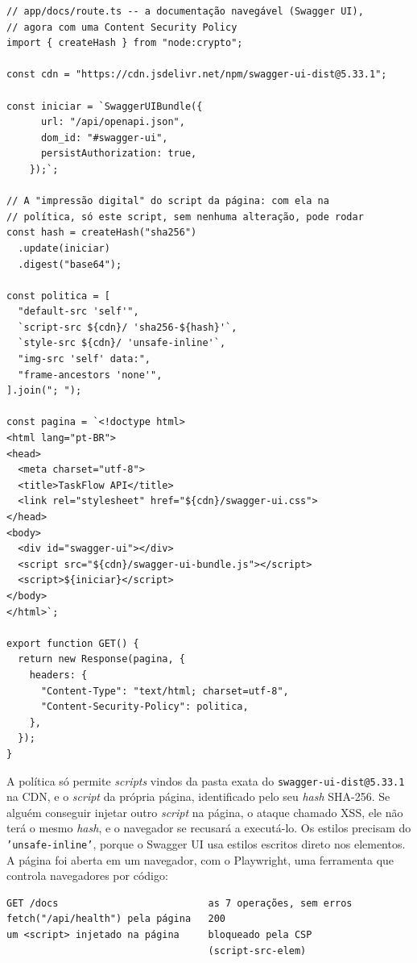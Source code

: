 \begin{codigo}
\begin{Verbatim}[breaklines=true, breaksymbolleft={}, fontsize=\footnotesize]
// app/docs/route.ts -- a documentação navegável (Swagger UI),
// agora com uma Content Security Policy
import { createHash } from "node:crypto";

const cdn = "https://cdn.jsdelivr.net/npm/swagger-ui-dist@5.33.1";

const iniciar = `SwaggerUIBundle({
      url: "/api/openapi.json",
      dom_id: "#swagger-ui",
      persistAuthorization: true,
    });`;

// A "impressão digital" do script da página: com ela na
// política, só este script, sem nenhuma alteração, pode rodar
const hash = createHash("sha256")
  .update(iniciar)
  .digest("base64");

const politica = [
  "default-src 'self'",
  `script-src ${cdn}/ 'sha256-${hash}'`,
  `style-src ${cdn}/ 'unsafe-inline'`,
  "img-src 'self' data:",
  "frame-ancestors 'none'",
].join("; ");

const pagina = `<!doctype html>
<html lang="pt-BR">
<head>
  <meta charset="utf-8">
  <title>TaskFlow API</title>
  <link rel="stylesheet" href="${cdn}/swagger-ui.css">
</head>
<body>
  <div id="swagger-ui"></div>
  <script src="${cdn}/swagger-ui-bundle.js"></script>
  <script>${iniciar}</script>
</body>
</html>`;

export function GET() {
  return new Response(pagina, {
    headers: {
      "Content-Type": "text/html; charset=utf-8",
      "Content-Security-Policy": politica,
    },
  });
}
\end{Verbatim}
\end{codigo}

A política só permite \textit{scripts} vindos da pasta exata do \texttt{swagger-ui-dist@5.33.1} na CDN, e o \textit{script} da própria página, identificado pelo seu \textit{hash} SHA-256. Se alguém conseguir injetar outro \textit{script} na página, o ataque chamado XSS, ele não terá o mesmo \textit{hash}, e o navegador se recusará a executá-lo. Os estilos precisam do \texttt{'unsafe-inline'}, porque o Swagger UI usa estilos escritos direto nos elementos. A página foi aberta em um navegador, com o Playwright, uma ferramenta que controla navegadores por código:

\begin{codigo}
\begin{Verbatim}[breaklines=true, breaksymbolleft={}, fontsize=\footnotesize]
GET /docs                          as 7 operações, sem erros
fetch("/api/health") pela página   200
um <script> injetado na página     bloqueado pela CSP
                                   (script-src-elem)
\end{Verbatim}
\end{codigo}

